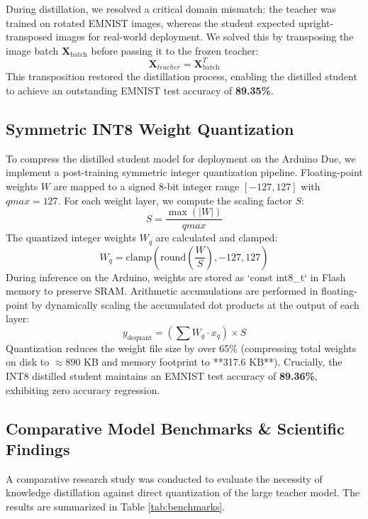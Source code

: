 \documentclass[12pt,a4paper]{article}
\begin{document}
During distillation, we resolved a critical domain mismatch: the teacher was trained on rotated EMNIST images, whereas the student expected upright-transposed images for real-world deployment. We solved this by transposing the image batch $\mathbf{X}_{\text{batch}}$ before passing it to the frozen teacher:
\begin{equation}
    \mathbf{X}_{teacher} = \mathbf{X}_{\text{batch}}^{T}
\end{equation}
This transposition restored the distillation process, enabling the distilled student to achieve an outstanding EMNIST test accuracy of \textbf{89.35\%}.

\subsection{Symmetric INT8 Weight Quantization}
To compress the distilled student model for deployment on the Arduino Due, we implement a post-training symmetric integer quantization pipeline. Floating-point weights $W$ are mapped to a signed 8-bit integer range $[-127, 127]$ with $qmax = 127$. For each weight layer, we compute the scaling factor $S$:
\begin{equation}
    S = \frac{\max(|W|)}{qmax}
\end{equation}
The quantized integer weights $W_q$ are calculated and clamped:
\begin{equation}
    W_q = \text{clamp}\left( \text{round}\left( \frac{W}{S} \right), -127, 127 \right)
\end{equation}
During inference on the Arduino, weights are stored as `const int8_t` in Flash memory to preserve SRAM. Arithmetic accumulations are performed in floating-point by dynamically scaling the accumulated dot products at the output of each layer:
\begin{equation}
    y_{\text{dequant}} = \left( \sum W_q \cdot x_q \right) \times S
\end{equation}
Quantization reduces the weight file size by over 65\% (compressing total weights on disk to $\approx 890$ KB and memory footprint to **317.6 KB**). Crucially, the INT8 distilled student maintains an EMNIST test accuracy of \textbf{89.36\%}, exhibiting zero accuracy regression.

\subsection{Comparative Model Benchmarks \& Scientific Findings}
A comparative research study was conducted to evaluate the necessity of knowledge distillation against direct quantization of the large teacher model. The results are summarized in Table \ref{tab:benchmarks}.
\end{document}
